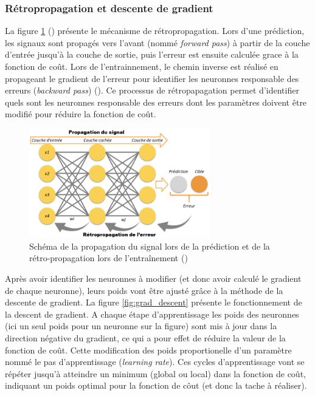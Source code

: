 \subsubsection{Rétropropagation et descente de gradient}
La figure \ref{fig:retropop} (\cite{scalzitti_nouvelle_2021}) présente le mécanisme de rétropropagation. Lors d'une prédiction, les signaux sont propagés vers l'avant (nommé \textit{forward pass}) à partir de la couche d'entrée jusqu'à la couche de sortie, puis l'erreur est ensuite calculée grace à la fonction de coût. Lors de l'entrainnement, le chemin inverse est réalisé en propageant le gradient de l'erreur pour identifier les neuronnes responsable des erreurs (\textit{backward pass}) (\cite{lecun_deep_2015}). Ce processus de rétropapagation permet d'identifier quels sont les neuronnes responsable des erreurs dont les paramètres doivent être modifié pour réduire la fonction de coût.
\begin{figure}[!htbp]
 \centering
 \includegraphics[width=0.7\textwidth]{figures/retro_propagation.png}
 \caption[Schéma de la rétro-propagation]{Schéma de la propagation du signal lors de la prédiction et de la rétro-propagation lors de l'entraînement (\cite{scalzitti_nouvelle_2021})}
 \label{fig:retropop}
\end{figure}
Après avoir identifier les neuronnes à modifier (et donc avoir calculé le gradient de chaque neuronne), leurs poids vont être ajusté grâce à la méthode de la descente de gradient. La figure \ref{fig:grad_descent} présente le fonctionnement de la descent de gradient. A chaque étape d'apprentissage les poids des neuronnes (ici un seul poids pour un neuronne sur la figure) sont mis à jour dans la direction négative du gradient, ce qui a pour effet de réduire la valeur de la fonction de coût. Cette modification des poids  proportionelle d'un paramètre nommé le pas d'apprentissage (\textit{learning rate}). Ces cycles d'apprentissage vont se répéter jusqu'à atteindre un minimum (global ou local) dans la fonction de coût, indiquant un poids optimal pour la fonction de côut (et donc la tache à réaliser).
